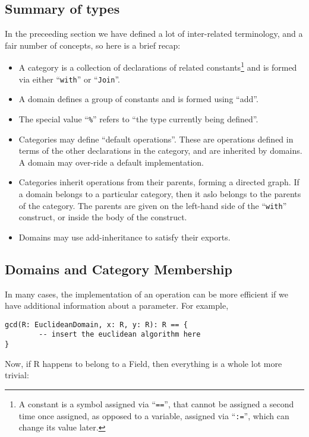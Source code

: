 \documentclass{article}
\begin{document}
\subsection{Summary of types}

In the preceeding section we have defined a lot of inter-related
terminology, and a fair number of concepts, so here is a brief recap:
\begin{itemize}
\item A category is a collection of declarations of related
constants\footnote{A constant is a symbol assigned via ``{\tt ==}'',
that cannot be assigned a second time once assigned, as opposed to a variable,
assigned via ``{\tt :=}'', which can change its value later.}
and is formed via either ``{\tt with}'' or ``{\tt Join}''.
\item A domain defines a group of constants and is formed using
``add''. 
\item The special value ``\verb!%!'' refers to ``the type currently
being defined''.
\item Categories may define ``default operations''.  These are
operations defined in terms of the other declarations in the category,
and are inherited by domains.  A domain may over-ride a default
implementation.
\item Categories inherit operations from their parents, forming a
directed graph.  If a domain belongs to a particular category, then it
aslo belongs to the parents of the category.  The parents are given on
the left-hand side of the ``{\tt with}'' construct, or inside the body of
the construct.
\item Domains may use add-inheritance to satisfy their exports.
\end{itemize}

\subsection{Domains and Category Membership}

In many cases, the implementation of an operation can be more
efficient if we have additional information about a parameter.  For
example,

\begin{small}
\begin{verbatim}
gcd(R: EuclideanDomain, x: R, y: R): R == {
        -- insert the euclidean algorithm here
}
\end{verbatim}
\end{small}

Now, if R happens to belong to a Field, then everything is
a whole lot more trivial:
\end{document}
